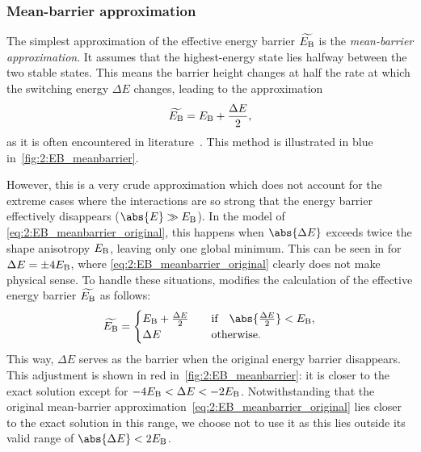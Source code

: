 \subsubsection{Mean-barrier approximation} %
The simplest approximation of the effective energy barrier $\widetilde{E_\mathrm{B}}$ is the \textit{mean-barrier approximation}.
It assumes that the highest-energy state lies halfway between the two stable states.
This means the barrier height changes at half the rate at which the switching energy $\Delta E$ changes, leading to the approximation %
\begin{equation}
	\label{eq:2:EB_meanbarrier_original}
	\widetilde{E_\mathrm{B}} = E_\mathrm{B} + \frac{\Delta E}{2} \mathrm{,}
\end{equation}
as it is often encountered in literature~\cite{MC_TemperatureDesorption,DirectionalEnergyBarrier}.
This method is illustrated in blue in~\cref{fig:2:EB_meanbarrier}. \par
However, this is a very crude approximation which does not account for the extreme cases where the interactions are so strong that the energy barrier effectively disappears ($\abs{E} \gg \EB$).
In the model of \cref{eq:2:EB_meanbarrier_original}, this happens when $\abs{\Delta E}$ exceeds twice the shape anisotropy $E_\mathrm{B}$, leaving only one global minimum.
This can be seen in  for $\Delta E = \pm 4 E_\mathrm{B}$, where \cref{eq:2:EB_meanbarrier_original} clearly does not make physical sense.
To handle these situations, \hotspice modifies the calculation of the effective energy barrier $\widetilde{E_\mathrm{B}}$ as follows:
\begin{equation}
	\label{eq:2:EB_meanbarrier_cases}
	\widetilde{E_\mathrm{B}} = \begin{cases}
		E_\mathrm{B} + \frac{\Delta E}{2} & \quad \text{if} \quad \abs{\frac{\Delta E}{2}} < E_\mathrm{B}, \\
		\Delta E & \quad \text{otherwise}.
	\end{cases}
\end{equation}
This way, $\Delta E$ serves as the barrier when the original energy barrier disappears.
This adjustment is shown in red in~\cref{fig:2:EB_meanbarrier}: it is closer to the exact solution except for $-4 E_\mathrm{B} < \Delta E < -2 E_\mathrm{B}$.
Notwithstanding that the original mean-barrier approximation~\eqref{eq:2:EB_meanbarrier_original} lies closer to the exact solution in this range, we choose not to use it as this lies outside its valid range of $\abs{\Delta E} < 2 \EB$.


